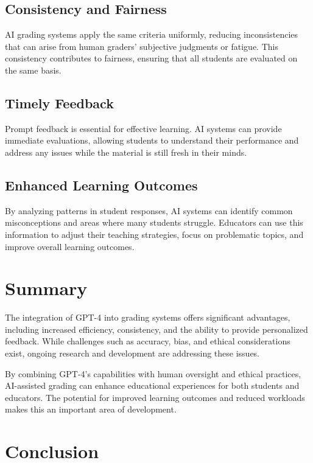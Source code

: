 \documentclass[ms,twoside,print]{nuthesis}
\begin{document}
\subsection{Consistency and Fairness}

AI grading systems apply the same criteria uniformly, reducing inconsistencies that can arise from human graders' subjective judgments or fatigue. This consistency contributes to fairness, ensuring that all students are evaluated on the same basis.

\subsection{Timely Feedback}

Prompt feedback is essential for effective learning. AI systems can provide immediate evaluations, allowing students to understand their performance and address any issues while the material is still fresh in their minds.

\subsection{Enhanced Learning Outcomes}

By analyzing patterns in student responses, AI systems can identify common misconceptions and areas where many students struggle. Educators can use this information to adjust their teaching strategies, focus on problematic topics, and improve overall learning outcomes.

\section{Summary}

The integration of GPT-4 into grading systems offers significant advantages, including increased efficiency, consistency, and the ability to provide personalized feedback. While challenges such as accuracy, bias, and ethical considerations exist, ongoing research and development are addressing these issues.

By combining GPT-4's capabilities with human oversight and ethical practices, AI-assisted grading can enhance educational experiences for both students and educators. The potential for improved learning outcomes and reduced workloads makes this an important area of development.

\section{Conclusion}
\end{document}
